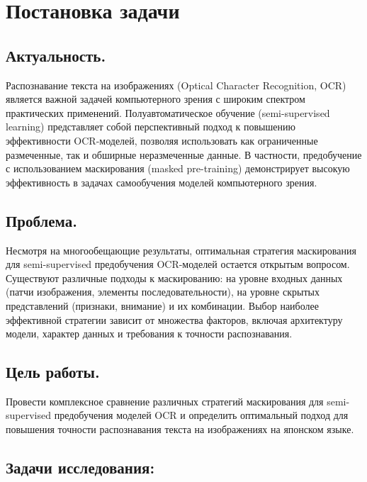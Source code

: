 \section{Постановка задачи}
\label{sec:Chapter1} 


\subsection{Актуальность.} 

Распознавание текста на изображениях (Optical Character Recognition, OCR) является важной задачей компьютерного зрения с широким спектром практических применений. Полуавтоматическое обучение (semi-supervised learning)  представляет собой перспективный подход к повышению эффективности OCR-моделей, позволяя использовать как ограниченные размеченные, так и обширные неразмеченные данные. В частности,  предобучение с использованием маскирования (masked pre-training)  демонстрирует высокую эффективность в задачах  самообучения  моделей компьютерного зрения.

\subsection{Проблема.}

Несмотря на многообещающие результаты,  оптимальная стратегия  маскирования  для semi-supervised  предобучения OCR-моделей остается открытым вопросом. Существуют  различные  подходы  к маскированию:  на  уровне  входных  данных  (патчи изображения, элементы последовательности),  на уровне скрытых  представлений  (признаки,  внимание) и их комбинации.   Выбор наиболее эффективной стратегии  зависит от  множества  факторов,  включая  архитектуру  модели,  характер  данных  и  требования  к  точности распознавания.

\subsection{Цель работы.} 

Провести комплексное сравнение различных  стратегий  маскирования  для semi-supervised  предобучения  моделей  OCR  и определить оптимальный подход для повышения точности распознавания текста на изображениях на японском языке.

\subsection{Задачи исследования:}


